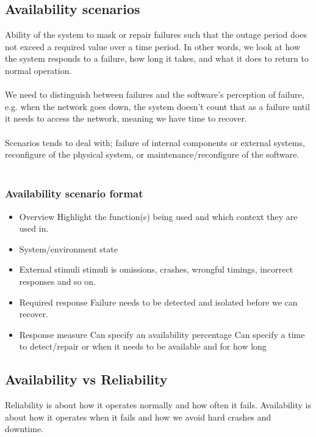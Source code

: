 \subsection{Availability scenarios}
Ability of the system to mask or repair failures such that the outage period does not exceed a required value over a time period. In other words, we look at how the system responds to a failure, how long it takes, and what it does to return to normal operation.\\
\\
We need to distinguish between failures and the software's perception of failure, e.g. when the network goes down, the system doesn't count that as a failure until it needs to access the network, meaning we have time to recover.\\
\\
Scenarios tends to deal with; failure of internal components or external systems, reconfigure of the physical system, or maintenance/reconfigure of the software.\\
\\
\subsubsection{Availability scenario format}
\begin{itemize}
	\item Overview
	      \subitem Highlight the function(s) being used and which context they are used in.
	\item System/environment state
	\item External stimuli
	      \subitem stimuli is omissions, crashes, wrongful timings, incorrect responses and so on.
	\item Required response
	      \subitem Failure needs to be detected and isolated before we can recover.
	\item Response measure
	      \subitem Can specify an availability percentage
	      \subitem Can specify a time to detect/repair or when it needs to be available and for how long
\end{itemize}
\subsection{Availability vs Reliability}
Reliability is about how it operates normally and how often it fails. Availability is about how it operates when it fails and how we avoid hard crashes and downtime.
